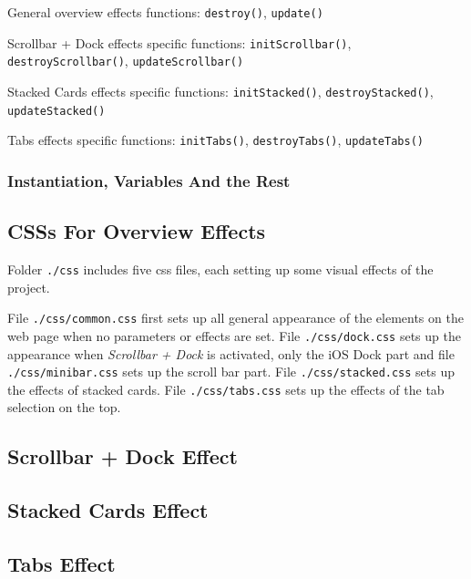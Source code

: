 General overview effects functions: \texttt{destroy()}, \texttt{update()}

Scrollbar + Dock effects specific functions: \texttt{initScrollbar()}, \texttt{destroyScrollbar()}, \texttt{updateScrollbar()}

Stacked Cards effects specific functions: \texttt{initStacked()}, \texttt{destroyStacked()}, \texttt{updateStacked()}

Tabs effects specific functions: \texttt{initTabs()}, \texttt{destroyTabs()}, \texttt{updateTabs()}

\subsubsection{Instantiation, Variables And the Rest}

\subsection{CSSs For Overview Effects}
\label{chap4:frontend-css}

Folder \texttt{./css} includes five \gls{css} files, each setting up some visual effects of the project.

File \texttt{./css/common.css} first sets up all general appearance of the elements on the web page when no parameters or effects are set. File \texttt{./css/dock.css} sets up the appearance when \emph{Scrollbar + Dock} is activated, only the iOS Dock part and file \\\texttt{./css/minibar.css} sets up the scroll bar part. File \texttt{./css/stacked.css} sets up the effects of stacked cards. File \texttt{./css/tabs.css} sets up the effects of the tab selection on the top.

\subsection{Scrollbar + Dock Effect}

\subsection{Stacked Cards Effect}

\subsection{Tabs Effect}



